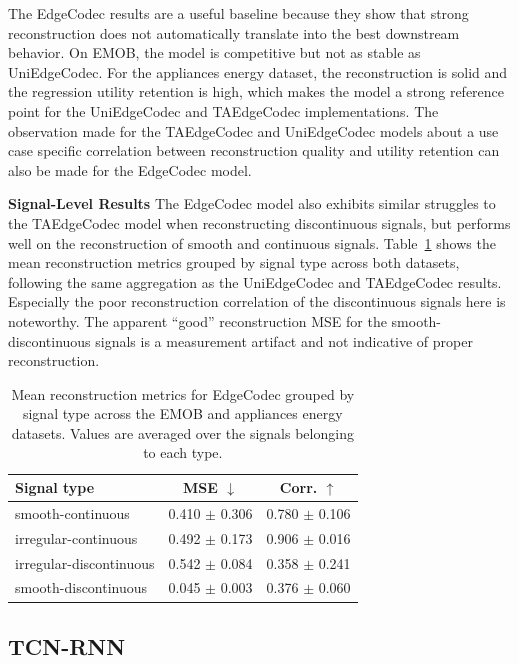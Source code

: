 The EdgeCodec results are a useful baseline because they show that strong reconstruction does not automatically translate into the best downstream behavior. On EMOB, the model is competitive but not as stable as UniEdgeCodec. For the appliances energy dataset, the reconstruction is solid and the regression utility retention is high, which makes the model a strong reference point for the UniEdgeCodec and TAEdgeCodec implementations. The observation made for the TAEdgeCodec and UniEdgeCodec models about a use case specific correlation between reconstruction quality and utility retention can also be made for the EdgeCodec model. 

\textbf{Signal-Level Results} The EdgeCodec model also exhibits similar struggles to the TAEdgeCodec model when reconstructing discontinuous signals, but performs well on the reconstruction of smooth and continuous signals. Table~\ref{tab:edge-signal-specific} shows the mean reconstruction metrics grouped by signal type across both datasets, following the same aggregation as the UniEdgeCodec and TAEdgeCodec results. Especially the poor reconstruction correlation of the discontinuous signals here is noteworthy. The apparent ``good'' reconstruction MSE for the smooth-discontinuous signals is a measurement artifact and not indicative of proper reconstruction.

\begin{table}[htbp]
\centering
\small
\caption{Mean reconstruction metrics for EdgeCodec grouped by signal type across the EMOB and appliances energy datasets. Values are averaged over the signals belonging to each type.}
\label{tab:edge-signal-specific}
\begin{tabular}{lcc}
\toprule
\textbf{Signal type} & \textbf{MSE} $\downarrow$ & \textbf{Corr.} $\uparrow$ \\
\midrule
smooth-continuous       & 0.410 $\pm$ 0.306 & 0.780 $\pm$ 0.106 \\
irregular-continuous    & 0.492 $\pm$ 0.173 & 0.906 $\pm$ 0.016 \\
irregular-discontinuous & 0.542 $\pm$ 0.084 & 0.358 $\pm$ 0.241 \\
smooth-discontinuous    & 0.045 $\pm$ 0.003 & 0.376 $\pm$ 0.060 \\
\bottomrule
\end{tabular}
\end{table}

\subsection{TCN-RNN}


